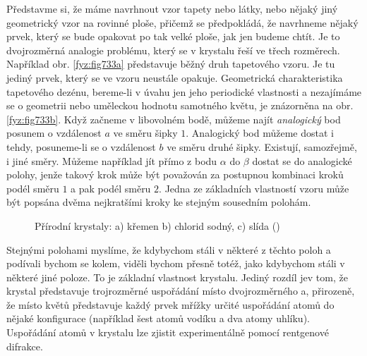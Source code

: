     Představme si, že máme navrhnout vzor tapety nebo látky, nebo nějaký jiný geometrický vzor na 
    rovinné ploše, přičemž se předpokládá, že navrhneme nějaký prvek, který se bude opakovat po tak 
    velké ploše, jak jen budeme chtít. Je to dvojrozměrná analogie problému, který se v krystalu 
    řeší ve třech rozměrech. Například obr. \ref{fyz:fig733a} představuje běžný druh tapetového 
    vzoru. Je tu jediný prvek, který se ve vzoru neustále opakuje. Geometrická charakteristika 
    tapetového dezénu, bereme-li v úvahu jen jeho periodické vlastnosti a nezajímáme se o geometrii 
    nebo uměleckou hodnotu samotného květu, je znázorněna na obr. \ref{fyz:fig733b}. Když začneme v 
    libovolném bodě, můžeme najít \emph{analogický} bod posunem o vzdálenost \(a\) ve směru šipky 
    \(1\). Analogický bod můžeme dostat i tehdy, posuneme-li se o vzdálenost \(b\) ve směru druhé 
    šipky. Existují, samozřejmě, i jiné směry. Můžeme například jít přímo z bodu \(\alpha\) do 
    \(\beta\)  dostat se do analogické polohy, jenže takový krok může být považován za postupnou 
    kombinaci kroků podél směru \(1\) a pak podél směru \(2\). Jedna ze základních vlastností vzoru 
    může být popsána dvěma nejkratšími kroky ke stejným sousedním polohám.
    
    \begin{figure}[ht!]
      \centering
                    \newline
      \caption{Přírodní krystaly: a) křemen b) chlorid sodný, c) slída
               (\cite[s.~545]{Feynman02})}
    \end{figure}

    Stejnými polohami myslíme, že kdybychom stáli v některé z těchto poloh a podívali bychom se 
    kolem, viděli bychom přesně totéž, jako kdybychom stáli v některé jiné poloze. To je základní 
    vlastnost krystalu. Jediný rozdíl jev tom, že krystal představuje trojrozměrné uspořádání místo 
    dvojrozměrného a, přirozeně, že místo květů představuje každý prvek mřížky určité uspořádání 
    atomů do nějaké konfigurace (například šest atomů vodíku a dva atomy uhlíku). Uspořádání atomů 
    v krystalu lze zjistit experimentálně pomocí rentgenové difrakce. 
    
